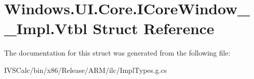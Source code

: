\hypertarget{struct_windows_1_1_u_i_1_1_core_1_1_i_core_window_____impl_1_1_vtbl}{}\section{Windows.\+U\+I.\+Core.\+I\+Core\+Window\+\_\+\+\_\+\+Impl.\+Vtbl Struct Reference}
\label{struct_windows_1_1_u_i_1_1_core_1_1_i_core_window_____impl_1_1_vtbl}


The documentation for this struct was generated from the following file\+:\begin{DoxyCompactItemize}
\item 
I\+V\+S\+Calc/bin/x86/\+Release/\+A\+R\+M/ilc/Impl\+Types.\+g.\+cs\end{DoxyCompactItemize}

